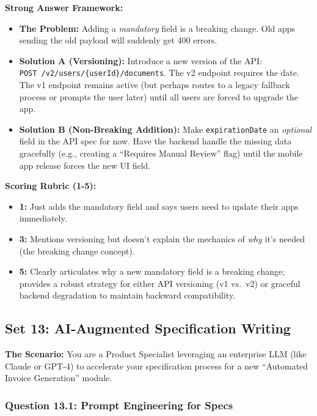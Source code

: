 \textbf{Strong Answer Framework:}

\begin{itemize}
\tightlist
\item
  \textbf{The Problem:} Adding a \emph{mandatory} field is a breaking
  change. Old apps sending the old payload will suddenly get 400 errors.
\item
  \textbf{Solution A (Versioning):} Introduce a new version of the API:
  \texttt{POST\ /v2/users/\{userId\}/documents}. The v2 endpoint
  requires the date. The v1 endpoint remains active (but perhaps routes
  to a legacy fallback process or prompts the user later) until all
  users are forced to upgrade the app.
\item
  \textbf{Solution B (Non-Breaking Addition):} Make
  \texttt{expirationDate} an \emph{optional} field in the API spec for
  now. Have the backend handle the missing data gracefully (e.g.,
  creating a ``Requires Manual Review'' flag) until the mobile app
  release forces the new UI field.
\end{itemize}

\textbf{Scoring Rubric (1-5):}

\begin{itemize}
\tightlist
\item
  \textbf{1:} Just adds the mandatory field and says users need to
  update their apps immediately.
\item
  \textbf{3:} Mentions versioning but doesn't explain the mechanics of
  \emph{why} it's needed (the breaking change concept).
\item
  \textbf{5:} Clearly articulates why a new mandatory field is a
  breaking change; provides a robust strategy for either API versioning
  (v1 vs.~v2) or graceful backend degradation to maintain backward
  compatibility.
\end{itemize}

\bigskip

\subsection{Set 13: AI-Augmented Specification
Writing}\label{set-13-ai-augmented-specification-writing}

\textbf{The Scenario:} You are a Product Specialist leveraging an
enterprise LLM (like Claude or GPT-4) to accelerate your specification
process for a new ``Automated Invoice Generation'' module.

\subsubsection{Question 13.1: Prompt Engineering for
Specs}\label{question-13.1-prompt-engineering-for-specs}

